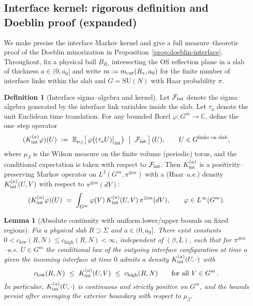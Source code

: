 \documentclass[11pt]{amsart}
\theoremstyle{plain}
\newtheorem{lemma}[theorem]{Lemma}
\theoremstyle{definition}
\newtheorem{definition}[theorem]{Definition}
\theoremstyle{remark}
\begin{document}
\subsection*{Interface kernel: rigorous definition and Doeblin proof (expanded)}
We make precise the interface Markov kernel and give a full measure–theoretic proof of the Doeblin minorization in Proposition~\ref{prop:doeblin-interface}. Throughout, fix a physical ball $B_{R_*}$ intersecting the OS reflection plane in a slab of thickness $a\in(0,a_0]$ and write $m:=m_{\rm cut}(R_*,a_0)$ for the finite number of interface links within the slab and $G=\mathrm{SU}(N)$ with Haar probability $\pi$.

\begin{definition}[Interface sigma–algebra and kernel]\label{def:interface-kernel}
Let $\mathcal{F}_{\rm int}$ denote the sigma–algebra generated by the interface link variables inside the slab. Let $\tau_a$ denote the unit Euclidean time translation. For any bounded Borel $\varphi:G^m\to\mathbb{C}$, define the one–step operator
\[
  (K_{\rm int}^{(a)}\varphi)(U)\ :=\ \mathbb{E}_{\mu_{\beta}}\!\left[\,\varphi\big( (\tau_a U)\big|_{\rm int}\big)\ \bigm|\ \mathcal{F}_{\rm int}\,\right](U),\qquad U\in G^{\text{links on slab}},
\]
where $\mu_{\beta}$ is the Wilson measure on the finite volume (periodic) torus, and the conditional expectation is taken with respect to $\mathcal{F}_{\rm int}$. Then $K_{\rm int}^{(a)}$ is a positivity–preserving Markov operator on $L^2(G^m,\pi^{\otimes m})$ with a (Haar–a.e.) density $K_{\rm int}^{(a)}(U,V)$ with respect to $\pi^{\otimes m}(dV)$:
\[
  (K_{\rm int}^{(a)}\varphi)(U)\ =\ \int_{G^m} \varphi(V)\,K_{\rm int}^{(a)}(U,V)\,\pi^{\otimes m}(dV),\qquad \varphi\in L^\infty(G^m).
\]
\end{definition}
\begin{lemma}[Absolute continuity with uniform lower/upper bounds on fixed regions]\label{lem:abs-cont}
Fix a physical slab $R\supset\Sigma$ and $a\in(0,a_0]$. There exist constants $0<c_\mathrm{low}(R,N)\le c_\mathrm{high}(R,N)<\infty$, independent of $(\beta,L)$, such that for $\pi^{\otimes m}$–a.e. $U\in G^m$ the conditional law of the outgoing interface configuration at time $a$ given the incoming interface at time $0$ admits a density $K_{\rm int}^{(a)}(U,\cdot)$ with
\[
  c_\mathrm{low}(R,N)\ \le\ K_{\rm int}^{(a)}(U,V)\ \le\ c_\mathrm{high}(R,N)\qquad\text{for all }V\in G^m\,.
\]
In particular, $K_{\rm int}^{(a)}(U,\cdot)$ is continuous and strictly positive on $G^m$, and the bounds persist after averaging the exterior boundary with respect to $\mu_{\beta}$.
\end{lemma}
\end{document}
